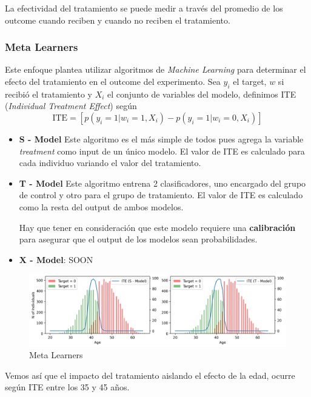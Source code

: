 La efectividad del tratamiento se puede medir a través del promedio de los outcome cuando reciben y cuando no reciben el tratamiento. 

\subsubsection{Meta Learners}

Este enfoque plantea utilizar algoritmos de \textit{Machine Learning} para determinar el efecto del tratamiento en el outcome del experimento. Sea $y_i$ el target, $w$ si recibió el tratamiento y $X_i$ el conjunto de variables del modelo, definimos ITE (\textit{Individual Treatment Effect}) según 
$$
\text{ITE} = \left [ p(y_i = 1 | w_i = 1, X_i) - p(y_i = 1 | w_i = 0, X_i) \right ]
$$

\begin{itemize}
    \item \textbf{S - Model} Este algoritmo es el más simple de todos pues agrega la variable \textit{treatment} como input de un único modelo. El valor de ITE es calculado para cada individuo variando el valor del tratamiento. 
    \item \textbf{T - Model} Este algoritmo entrena 2 clasificadores, uno encargado del grupo de control y otro para el grupo de tratamiento. El valor de ITE es calculado como la resta del output de ambos modelos. 

    Hay que tener en consideración que este modelo requiere una \textbf{calibración} para asegurar que el output de los modelos sean probabilidades.
    \item \textbf{X - Model}: SOON 
\end{itemize}


\begin{figure}[H]
    \center
    \includegraphics[scale=0.5]{notebooks/STATS/img/causal_inference_meta_learners.png}
    \caption{Meta Learners}
\end{figure}

Vemos así que el impacto del tratamiento aislando el efecto de la edad, ocurre según ITE entre los 35 y 45 años. 





